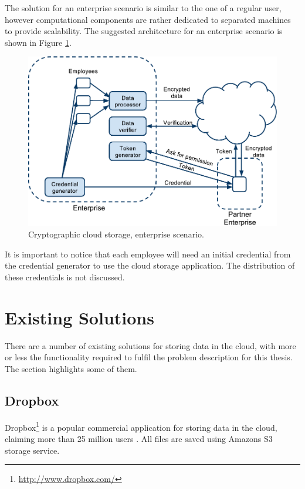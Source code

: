 \documentclass[pdftex,english,10pt,b5paper,twoside]{book}
\begin{document}
The solution for an enterprise scenario is similar to the one of a regular
user, however computational components are rather dedicated to separated
machines to provide scalability. The suggested architecture for an enterprise
scenario is shown in Figure \ref{fig:RW:CCS:EA}. 
\begin{figure}[h!]
    \centering
    \includegraphics[scale=0.6]{ArchitectureCCSE.pdf}
    \caption{Cryptographic cloud storage, enterprise scenario.}
    \label{fig:RW:CCS:EA}
\end{figure}
It is important to notice that each employee will need an initial credential
from the credential generator to use the cloud storage application. The
distribution of these credentials is not discussed.

\section{Existing Solutions}
\label{sec:existing}

There are a number of existing solutions for storing data in the cloud,
with more or less the functionality required to fulfil the problem
description for this thesis. The section highlights some of them.

\subsection{Dropbox}

Dropbox\footnote{\url{http://www.dropbox.com/}} is a popular commercial
application for storing data in the cloud, claiming more than 25 million users
\cite{dropbox_users}. All files are saved using Amazons S3 storage service.
\end{document}
